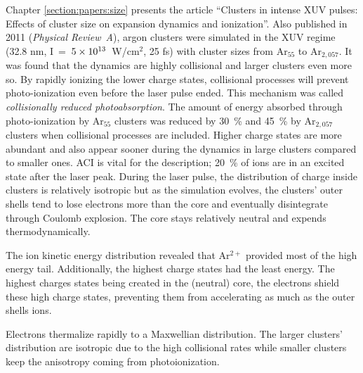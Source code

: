 Chapter \ref{section:papers:size} presents the article ``Clusters in
intense XUV pulses: Effects of cluster size on expansion dynamics and
ionization''. Also published in 2011 (\textit{Physical Review~A}\cite{Ackad2011b}),
argon clusters were simulated in the XUV regime (32.8 nm,
I~=~$\ten{5}{13}$~W/cm$^{2}$, 25 fs) with cluster sizes from Ar$_{55}$ to
Ar$_{2,057}$. It was found that the dynamics are highly collisional and
larger clusters even more so. By rapidly ionizing the lower charge states,
collisional processes will prevent photo-ionization even before the laser pulse
ended. This mechanism was called \textit{collisionally reduced photoabsorption}.
The amount of energy absorbed through photo-ionization by Ar$_{55}$ clusters was
reduced by 30~\% and 45~\% by Ar$_{2,057}$ clusters when collisional processes
are included.
Higher charge states are more abundant and also appear sooner during the
dynamics in large clusters compared to smaller ones. ACI is vital for the
description; 20~\% of ions are in an excited state after the laser peak.
During the laser pulse, the distribution of charge inside clusters is
relatively isotropic but as the simulation evolves, the clusters' outer shells tend to
lose electrons more than the core and eventually disintegrate through Coulomb
explosion.
The core stays relatively neutral and expends thermodynamically.

The ion kinetic energy distribution revealed that Ar$^{2+}$  provided most of
the high energy tail. Additionally, the highest charge states had the least
energy. The highest charges states being created in the (neutral) core, the
electrons shield these high charge states, preventing them from accelerating
as much as the outer shells ions.

Electrons thermalize rapidly to a Maxwellian distribution. The larger clusters'
distribution are isotropic due to the high collisional rates while smaller
clusters keep the anisotropy coming from photoionization.




